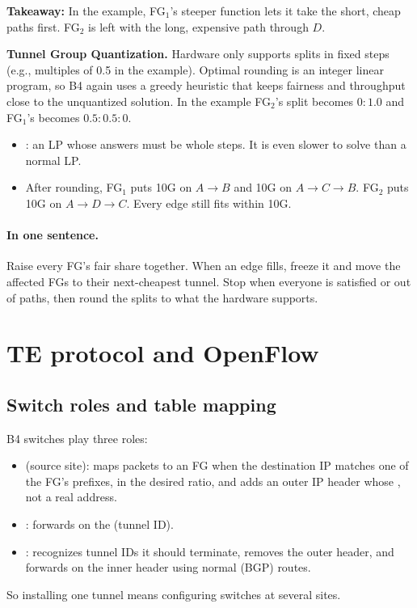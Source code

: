 \textbf{Takeaway:}  In the example, FG$_1$'s steeper function lets it take the short, cheap paths first. FG$_2$ is left with the long, expensive path through $D$.

\textbf{Tunnel Group Quantization.} Hardware only supports splits in fixed steps (e.g., multiples of 0.5 in the example). Optimal rounding is an integer linear program, so B4 again uses a greedy heuristic that keeps fairness and throughput close to the unquantized solution. In the example FG$_2$'s split becomes $0{:}1.0$ and FG$_1$'s becomes $0.5{:}0.5{:}0$.
\begin{itemize}
\item {}: an LP whose answers must be whole steps. It is even slower to solve than a normal LP.
\item After rounding, FG$_1$ puts 10G on $A\to B$ and 10G on $A\to C\to B$. FG$_2$ puts 10G on $A\to D\to C$. Every edge still fits within 10G.
\end{itemize}

\paragraph{In one sentence.} Raise every FG's fair share together. When an edge fills, freeze it and move the affected FGs to their next-cheapest tunnel. Stop when everyone is satisfied or out of paths, then round the splits to what the hardware supports.
\section{TE protocol and OpenFlow}
\subsection{Switch roles and table mapping}
B4 switches play three roles:
\begin{itemize}
\item {} (source site): maps packets to an FG when the destination IP matches one of the FG's prefixes,  in the desired ratio, and adds an outer IP header whose , not a real address.
\item {}: forwards on the  (tunnel ID).
\item {}: recognizes tunnel IDs it should terminate, removes the outer header, and forwards on the inner header using normal  (BGP) routes.
\end{itemize}
So installing one tunnel means configuring switches at several sites.


